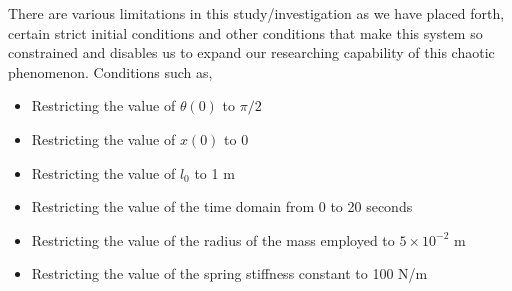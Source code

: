 {There are various limitations in this study/investigation as we have placed forth, certain strict initial conditions and other conditions that make this system so constrained and disables us to expand our researching capability of this chaotic phenomenon. Conditions such as,}
        
    \begin{itemize}
        \item {Restricting the value of $\theta(0)$ to $\pi/2$}
        \item {Restricting the value of $x(0)$ to $0$}
        \item {Restricting the value of $l_0$ to 1 m}
        \item {Restricting the value of the time domain from 0 to 20 seconds}
        \item {Restricting the value of the radius of the mass employed to $5\times10^{-2}$ m}
        \item {Restricting the value of the spring stiffness constant to 100 N/m}
    \end{itemize}
        
        

